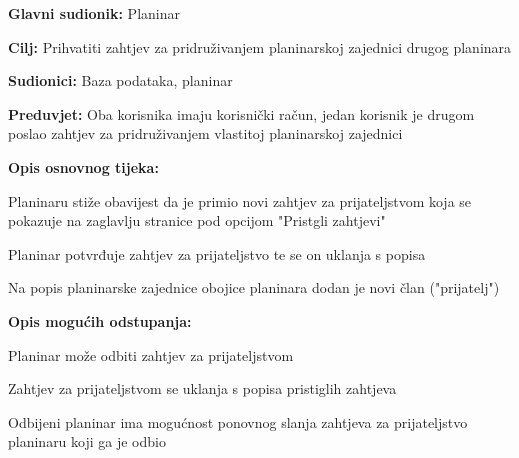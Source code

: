 		\noindent {}
		\begin{packed_item}
			
			\item \textbf{Glavni sudionik: }$ $Planinar$ $
			\item  \textbf{Cilj:} $ $Prihvatiti zahtjev za pridruživanjem planinarskoj zajednici drugog planinara$ $
			\item  \textbf{Sudionici:} $ $Baza podataka, planinar$ $
			\item  \textbf{Preduvjet:} $ $Oba korisnika imaju korisnički račun, jedan korisnik je drugom poslao zahtjev za pridruživanjem vlastitoj planinarskoj zajednici$ $
			\item  \textbf{Opis osnovnog tijeka:}
			
			\item[] \begin{packed_enum}
				
				\item $ $Planinaru stiže obavijest da je primio novi zahtjev za prijateljstvom koja se pokazuje na zaglavlju stranice pod opcijom "Pristgli zahtjevi"$ $
				\item $ $Planinar potvrđuje zahtjev za prijateljstvo te se on uklanja s popisa$ $
				\item $ $Na popis planinarske zajednice obojice planinara dodan je novi član ("prijatelj")$ $
				
			\end{packed_enum}
			
			\item  \textbf{Opis mogućih odstupanja:}
			
			\item[] \begin{packed_item}
				
				\item[2.a] $ $Planinar može odbiti zahtjev za prijateljstvom $ $
				\item[] \begin{packed_enum}
					
					\item $ $Zahtjev za prijateljstvom se uklanja s popisa pristiglih zahtjeva $ $
					\item $ $Odbijeni planinar ima mogućnost ponovnog slanja zahtjeva za prijateljstvo planinaru koji ga je odbio $ $
					
				\end{packed_enum}
			\end{packed_item}
		\end{packed_item}
	

